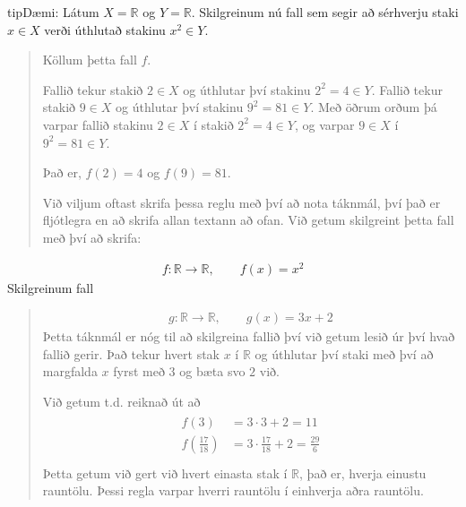 \documentclass[a4paper,10pt,icelandic]{sphinxmanual}
\begin{document}
\begin{sphinxadmonition}{tip}{Dæmi:}
 Látum \(X=\mathbb{R}\) og \(Y=\mathbb{R}\). Skilgreinum nú fall sem segir að sérhverju staki \(x\in X\) verði úthlutað stakinu \(x^2\in Y\).
\begin{quote}

Köllum þetta fall \(f\).

Fallið tekur stakið \(2 \in X\) og úthlutar því stakinu \(2^2 = 4 \in Y\). Fallið tekur stakið \(9 \in X\) og úthlutar því stakinu \(9^2 = 81 \in Y\).
Með öðrum orðum þá varpar fallið stakinu \(2 \in X\) í stakið \(2^2 = 4 \in Y\), og varpar \(9 \in X\) í \(9^2 = 81 \in Y\).

Það er, \(f(2)=4\) og \(f(9)=81\).

Við viljum oftast skrifa þessa reglu með því að nota táknmál, því það er fljótlegra en að skrifa allan textann að ofan. Við getum skilgreint þetta fall með því að skrifa:
\end{quote}
\begin{equation*}
\begin{split}f: \mathbb{R} \to \mathbb{R}, \qquad f(x)=x^2\end{split}
\end{equation*}
 Skilgreinum fall
\begin{quote}
\begin{equation*}
\begin{split}g: \mathbb{R} \to \mathbb{R}, \qquad g(x)=3x+2\end{split}
\end{equation*}
Þetta táknmál er nóg til að skilgreina fallið því við getum lesið úr því hvað fallið gerir. Það tekur hvert stak \(x\) í \(\mathbb{R}\) og úthlutar því staki með því að margfalda \(x\) fyrst með \(3\) og bæta svo \(2\) við.

Við getum t.d. reiknað út að
\begin{equation*}
\begin{split}\begin{aligned} f(3)&=3 \cdot 3 +2 = 11 \\ f\left(\frac{17}{18}\right)&=3 \cdot \frac{17}{18}+2=\frac{29}{6}\\ \end{aligned}\end{split}
\end{equation*}
Þetta getum við gert við hvert einasta stak í \(\mathbb{R}\), það er, hverja einustu rauntölu. Þessi regla varpar hverri rauntölu í einhverja aðra rauntölu.
\end{quote}


\end{sphinxadmonition}
\end{document}
